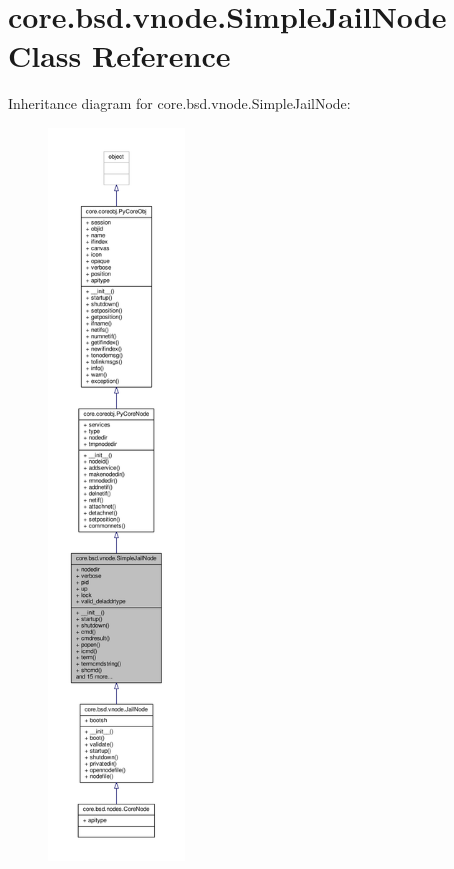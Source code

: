 \hypertarget{classcore_1_1bsd_1_1vnode_1_1_simple_jail_node}{\section{core.\+bsd.\+vnode.\+Simple\+Jail\+Node Class Reference}
\label{classcore_1_1bsd_1_1vnode_1_1_simple_jail_node}
}


Inheritance diagram for core.\+bsd.\+vnode.\+Simple\+Jail\+Node\+:
\nopagebreak
\begin{figure}[H]
\begin{center}
\leavevmode
\includegraphics[height=550pt]{classcore_1_1bsd_1_1vnode_1_1_simple_jail_node__inherit__graph}
\end{center}
\end{figure}


